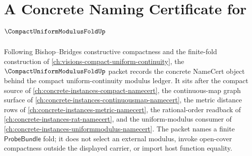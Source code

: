 \chapter{A Concrete Naming Certificate for $\CompactUniformModulusFoldUp$}
\label{ch:concrete-instances-compact-uniform-modulus-fold-namecert}

Following Bishop--Bridges constructive compactness and the finite-fold construction of \autoref{ch:visions-compact-uniform-continuity}, the $\CompactUniformModulusFoldUp$ packet records the concrete NameCert object behind the compact uniform-continuity modulus ledger. It sits after the compact source of \autoref{ch:concrete-instances-compact-namecert}, the continuous-map graph surface of \autoref{ch:concrete-instances-continuousmap-namecert}, the metric distance rows of \autoref{ch:concrete-instances-metric-namecert}, the rational-order readback of \autoref{ch:concrete-instances-rat-namecert}, and the uniform-modulus consumer of \autoref{ch:concrete-instances-uniformmodulus-namecert}. The packet names a finite $\mathsf{ProbeBundle}$ fold; it does not select an external modulus, invoke open-cover compactness outside the displayed carrier, or import host function equality.

